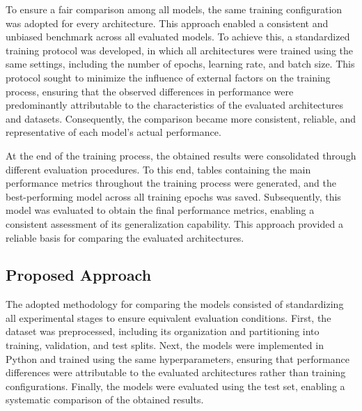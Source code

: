 \documentclass[11pt,a4paper]{article}
\begin{document}
To ensure a fair comparison among all models, the same training configuration was adopted for every architecture. This approach enabled a consistent and unbiased benchmark across all evaluated models. To achieve this, a standardized training protocol was developed, in which all architectures were trained using the same settings, including the number of epochs, learning rate, and batch size. This protocol sought to minimize the influence of external factors on the training process, ensuring that the observed differences in performance were predominantly attributable to the characteristics of the evaluated architectures and datasets. Consequently, the comparison became more consistent, reliable, and representative of each model's actual performance.


At the end of the training process, the obtained results were consolidated through different evaluation procedures. To this end, tables containing the main performance metrics throughout the training process were generated, and the best-performing model across all training epochs was saved. Subsequently, this model was evaluated to obtain the final performance metrics, enabling a consistent assessment of its generalization capability. This approach provided a reliable basis for comparing the evaluated architectures.


\subsection{Proposed Approach}
\label{sec:approach}

The adopted methodology for comparing the models consisted of standardizing all experimental stages to ensure equivalent evaluation conditions. First, the dataset was preprocessed, including its organization and partitioning into training, validation, and test splits. Next, the models were implemented in Python and trained using the same hyperparameters, ensuring that performance differences were attributable to the evaluated architectures rather than training configurations. Finally, the models were evaluated using the test set, enabling a systematic comparison of the obtained results.
\end{document}
